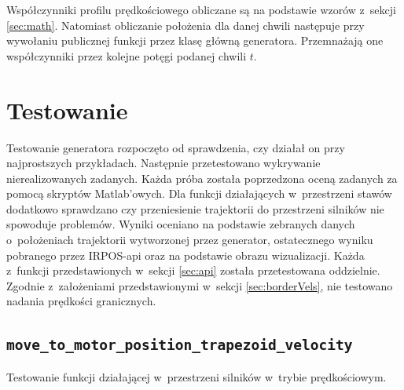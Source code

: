 \documentclass[a4paper, 12pt]{article}
\begin{document}
	\par Współczynniki profilu prędkościowego obliczane są na podstawie wzorów z~sekcji \ref{sec:math}. Natomiast obliczanie położenia dla danej chwili następuje przy wywołaniu publicznej funkcji przez klasę główną generatora. Przemnażają one współczynniki przez kolejne potęgi podanej chwili $t$.
	
	\section{Testowanie}
	Testowanie generatora rozpoczęto od sprawdzenia, czy działał on przy najprostszych przykładach. Następnie przetestowano wykrywanie nierealizowanych zadanych. Każda próba została poprzedzona oceną zadanych za pomocą skryptów Matlab'owych. Dla funkcji działających w~przestrzeni stawów dodatkowo sprawdzano czy przeniesienie trajektorii do przestrzeni silników nie spowoduje problemów. Wyniki oceniano na podstawie zebranych danych o~położeniach trajektorii wytworzonej przez generator, ostatecznego wyniku pobranego przez IRPOS-api oraz na podstawie obrazu wizualizacji. Każda z~funkcji przedstawionych w~sekcji \ref{sec:api} została przetestowana oddzielnie. Zgodnie z~założeniami przedstawionymi w~sekcji \ref{sec:borderVels}, nie testowano nadania prędkości granicznych.
	\subsection{\texttt{move\_to\_motor\_position\_trapezoid\_velocity}}
	Testowanie funkcji działającej w~przestrzeni silników w~trybie prędkościowym.
\end{document}
